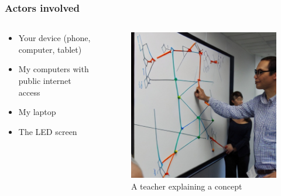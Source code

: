\documentclass[
	11pt,
	t,
]{beamer}
\begin{document}
\begin{frame}
	\frametitle{Actors involved}
	\begin{columns}
	  \begin{column}{0.7\textwidth}
		\begin{itemize}
		  \item Your device (phone, computer, tablet) \\
		  \item My computers with public internet access \\
		  \item My laptop \\
		  \item The LED screen \\
		\end{itemize}
	  \end{column}
	  \begin{column}{0.3\textwidth}
		\begin{center}
		  \begin{figure}
			\includegraphics[scale=0.17]{2.jpg}
			\caption{A teacher explaining a concept}
		  \end{figure}
		\end{center}
	  \end{column}
	\end{columns}
\end{frame}
\end{document}
